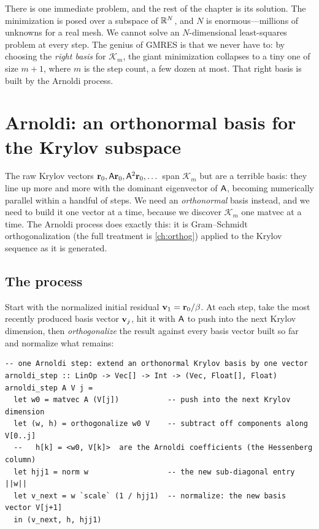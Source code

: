 There is one immediate problem, and the rest of the chapter is its solution. The
minimization is posed over a subspace of $\mathbb{R}^N$, and $N$ is enormous---millions
of unknowns for a real mesh. We cannot solve an $N$-dimensional least-squares
problem at every step. The genius of GMRES is that we never have to: by choosing
the \emph{right basis} for $\mathcal{K}_m$, the giant minimization collapses to a
tiny one of size $m+1$, where $m$ is the step count, a few dozen at most. That
right basis is built by the Arnoldi process.

\section{Arnoldi: an orthonormal basis for the Krylov subspace}

The raw Krylov vectors $\mathbf{r}_0,\mathsf{A}\mathbf{r}_0,\mathsf{A}^2\mathbf{r}_0,\dots$ span
$\mathcal{K}_m$ but are a terrible basis: they line up more and more with the
dominant eigenvector of $\mathsf{A}$, becoming numerically parallel within a handful
of steps. We need an \emph{orthonormal} basis instead, and we need to build it one
vector at a time, because we discover $\mathcal{K}_m$ one matvec at a time. The
Arnoldi process does exactly this: it is Gram--Schmidt orthogonalization (the full
treatment is \cref{ch:orthog}) applied to the Krylov sequence as it is generated.

\subsection{The process}

Start with the normalized initial residual $\mathbf{v}_1=\mathbf{r}_0/\beta$. At each step, take
the most recently produced basis vector $\mathbf{v}_j$, hit it with $\mathsf{A}$ to push into
the next Krylov dimension, then \emph{orthogonalize} the result against every basis
vector built so far and normalize what remains:

\begin{lstlisting}[style=l4style]
-- one Arnoldi step: extend an orthonormal Krylov basis by one vector
arnoldi_step :: LinOp -> Vec[] -> Int -> (Vec, Float[], Float)
arnoldi_step A V j =
  let w0 = matvec A (V[j])           -- push into the next Krylov dimension
  let (w, h) = orthogonalize w0 V    -- subtract off components along V[0..j]
  --   h[k] = <w0, V[k]>  are the Arnoldi coefficients (the Hessenberg column)
  let hjj1 = norm w                  -- the new sub-diagonal entry  ||w||
  let v_next = w `scale` (1 / hjj1)  -- normalize: the new basis vector V[j+1]
  in (v_next, h, hjj1)
\end{lstlisting}

